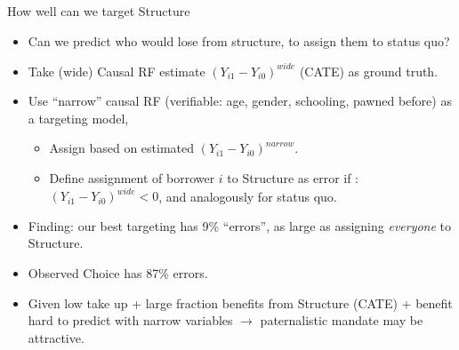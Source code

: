 \documentclass[9pt, aspectratio=169]{beamer}
\begin{document}
\begin{frame}{How well can we target Structure}
\begin{itemize}
    \item   Can we predict who would lose from structure, to assign them to status quo?
    \vfill \item Take (wide) Causal RF estimate $(Y_{i1}-Y_{i0})^{wide}$ (CATE) as ground truth.
    \vfill \item Use ``narrow'' causal RF (verifiable: age, gender, schooling, pawned before) as a targeting model,  
     \begin{itemize}
         \item Assign based on estimated $(Y_{i1}-Y_{i0})^{narrow}$.
         \item Define assignment of borrower $i$ to Structure as error if : $(Y_{i1}-Y_{i0})^{wide}<0$, and analogously for status quo.
     \end{itemize}

    \vfill \item Finding: our best targeting has 9\% ``errors'', as large as assigning \textit{everyone} to Structure. 
    \vfill\item Observed Choice has 87\% errors. 
    \vfill\item Given low take up + large fraction benefits from Structure (CATE) + benefit hard to predict with narrow variables $\rightarrow$ paternalistic mandate may be attractive.
\end{itemize}        
\end{frame}
\end{document}
